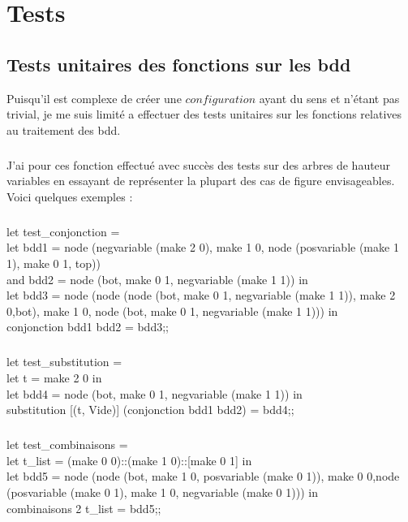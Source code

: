 \documentclass{report}
\begin{document}
\chapter{Tests}

\section{Tests unitaires des fonctions sur les bdd}
	Puisqu'il est complexe de créer une $configuration$ ayant du sens et n'étant pas trivial, je me suis limité a effectuer des tests unitaires sur les fonctions relatives au traitement des bdd.
	\paragraph{}
	J'ai pour ces fonction effectué avec succès des tests sur des arbres de hauteur variables en essayant de représenter la plupart des cas de figure envisageables. Voici quelques exemples :
	\paragraph{}
let test\_conjonction = \\
	let bdd1 = node (negvariable (make 2 0), make 1 0, node (posvariable (make 1 1), make 0 1, top))\\
	and bdd2 = node (bot, make 0 1, negvariable (make 1 1)) in\\
	let bdd3 = node (node (node (bot, make 0 1, negvariable (make 1 1)), make 2 0,bot), make 1 0, node (bot, make 0 1, negvariable (make 1 1))) in\\
	conjonction bdd1 bdd2 = bdd3;;
	\paragraph{}
let test\_substitution =\\
	let t = make 2 0 in\\
	let bdd4 = node (bot, make 0 1, negvariable (make 1 1)) in\\
	substitution [(t, Vide)] (conjonction bdd1 bdd2) = bdd4;;
	\paragraph{}
let test\_combinaisons =\\
	let t\_list = (make 0 0)::(make 1 0)::[make 0 1] in\\
	let bdd5 = node (node (bot, make 1 0, posvariable (make 0 1)), make 0 0,node (posvariable (make 0 1), make 1 0, negvariable (make 0 1))) in\\
	combinaisons 2 t\_list = bdd5;;
\end{document}
